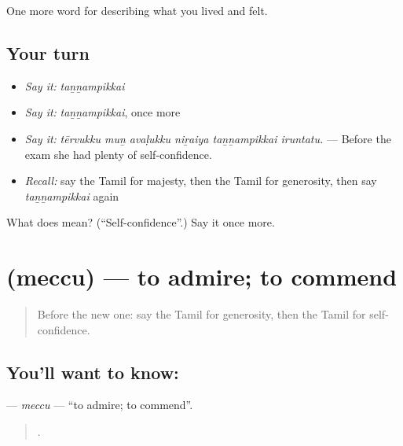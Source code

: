 \begin{grammarlens}[title={What you've built}]
One more word for describing what you lived and felt.
\end{grammarlens}

\subsection*{Your turn}
\begin{itemize}
\raggedright
  \item \emph{Say it:} \emph{taṉṉampikkai}
  \item \emph{Say it:} \emph{taṉṉampikkai}, once more
  \item \emph{Say it:} \emph{tērvukku muṉ avaḷukku niṟaiya taṉṉampikkai iruntatu.} — Before the exam she had plenty of self-confidence.
  \item \emph{Recall:} say the Tamil for majesty, then the Tamil for generosity, then say \emph{taṉṉampikkai} again
\end{itemize}

\begin{tcolorbox}[breakable,colback=teal!4,colframe=teal!35!black,title={Before you move on}]
What does  mean? (\textquotedblleft{}Self-confidence\textquotedblright{}.) Say it once more.
\end{tcolorbox}
\section[\texorpdfstring{\ta{மெச்சு} (meccu)}{மெச்சு (meccu)}]{ (meccu) — to admire; to commend}

\label{lesson:TA-C473-meccu}



\begin{quote}
Before the new one: say the Tamil for generosity, then the Tamil for self-confidence.
\end{quote}

\subsection*{You'll want to know: }
\textbf{} — \emph{meccu} — \textquotedblleft{}to admire; to commend\textquotedblright{}.

\begin{quote}
   .
\end{quote}

